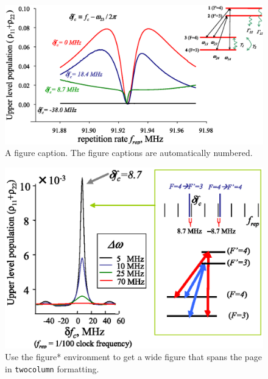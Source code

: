 \documentclass[%
aps,
prl,
showpacs,
twocolumn,
]{revtex4}
\begin{document}
\begin{figure}
\includegraphics[scale=0.4]{theory1_word}
\caption{\label{fig:theory1} A figure caption. The figure captions are
automatically numbered.}
\end{figure}


\begin{figure}
\includegraphics[scale=0.5]{theory2_word}%
\caption{\label{fig:wide}Use the figure* environment to get a wide
figure that spans the page in \texttt{twocolumn} formatting.}
\end{figure}
\end{document}
